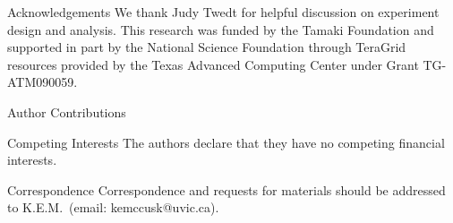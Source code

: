 \documentclass{nature}
\begin{document}

\begin{addendum}
\item[Acknowledgements] We thank Judy Twedt for helpful discussion on experiment design and analysis. This research was funded by the Tamaki Foundation and supported in part by the National Science Foundation through TeraGrid resources provided by the Texas Advanced Computing Center under Grant TG-ATM090059.
\item[Author Contributions] 
 \item[Competing Interests] The authors declare that they have no competing financial interests.
\item[Correspondence] Correspondence and requests for materials should be addressed to K.E.M.~(email: kemccusk@uvic.ca).
\end{addendum}

\end{document}
